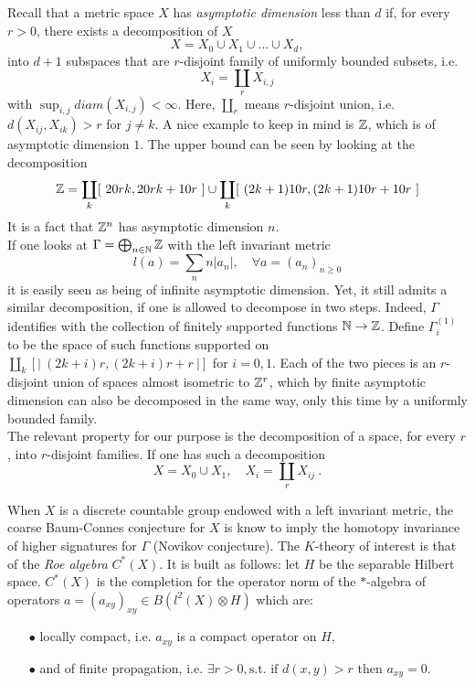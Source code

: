 Recall that a metric space $X$ has \textit{asymptotic dimension} less than $d$ if, for every $r>0$, there exists a decomposition of $X$
\[X = X_0 \cup X_1 \cup ... \cup X_d,\]
into $d+1$ subspaces that are $r$-disjoint family of uniformly bounded subsets, i.e. \[X_i = \coprod_r X_{i,j}\] with $\sup_{i,j} diam(X_{i,j})<\infty$. Here, $\coprod_r$ means $r$-disjoint union, i.e. $d(X_{ij},X_{ik})>r$ for $j\neq k$. A nice example to keep in mind is $\mathbb{Z}$, which is of asymptotic dimension $1$. The upper bound can be seen by looking at the decomposition 
\[ \mathbb{Z} = \coprod_k [ \ 20rk, 20rk+10r \ ] \cup \coprod_k [ \  (2k+1)10r , (2k+1)10r+10r \ ] \] It is a fact that $\mathbb{Z}^n$ has asymptotic dimension $n$. \\

If one looks at $\Gamma=\bigoplus_{n\in \mathbb{N}} \mathbb{Z}$ with the left invariant metric 
\[ l(a)= \sum_n n|a_n|, \quad \forall a = (a_n)_{n \geq 0}\] it is easily seen as being of infinite asymptotic dimension. Yet, it still admits a similar decomposition, if one is allowed to decompose in two steps. Indeed, $\Gamma$ identifies with the collection of finitely supported functions $\mathbb{N} \rightarrow \mathbb{Z}$. Define $\Gamma_i^{(1)}$ to be the space of such functions supported on $\coprod_k [| \ (2k+i)r, (2k+i)r+r \ |]$ for $i=0,1$. Each of the two pieces is an $r$-disjoint union of spaces almost isometric to $\mathbb{Z}^r$, which by finite asymptotic dimension can also be decomposed in the same way, only this time by a uniformly bounded family.\\ 

The relevant property for our purpose is the decomposition of a space, for every $r$, into $r$-disjoint families. If one has such a decomposition
\[X = X_0 \cup X_1 , \quad X_i = \coprod_r X_{ij} \ .\]

When $X$ is a discrete countable group endowed with a left invariant metric, the coarse Baum-Connes conjecture for $X$ is know to imply the homotopy invariance of higher signatures for $\Gamma$ (Novikov conjecture). The $K$-theory of interest is that of the \textit{Roe algebra} $C^*(X)$. It is built as follows: let $H$ be the separable Hilbert space. $C^*(X)$ is the completion for the operator norm of the $*$-algebra of operators $a =(a_{xy})_{xy}\in B(l^2(X)\otimes H)$ which are:
\begin{itemize}
\item[$\bullet$] locally compact, i.e. $a_{xy}$ is a compact operator on $H$,
\item[$\bullet$] and of finite propagation, i.e. $\exists r> 0, \text{s.t. if } d(x,y)> r$ then $a_{xy}=0$.
\end{itemize}

